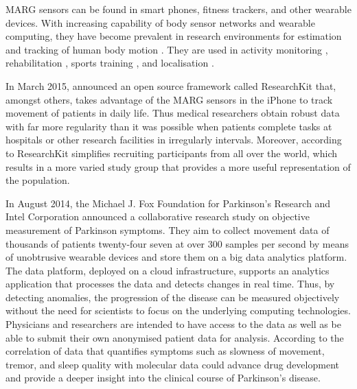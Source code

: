 MARG sensors can be found in smart phones, fitness trackers, and other wearable devices. With increasing capability of body sensor networks and wearable computing, they have become prevalent in research environments for estimation and tracking of human body motion \cite{bennett_motion_2014}. They are used in activity monitoring \cite{veltink_detection_96}\cite{najafi_ambulatory_03}\cite{ermes_sports_08}, rehabilitation \cite{giggins_rehabilitation_13}\cite{lupinski_ligament_11}, sports training \cite{bonnet_squat_13}\cite{ermes_sports_08}, and localisation \cite{hoflinger_localization_13}\cite{Bennett_distance_13}.

In March 2015, \citeauthor{Apple_2015} announced an open source framework called ResearchKit \cite{Apple_2015} that, amongst others, takes advantage of the MARG sensors in the iPhone to track movement of patients in daily life. Thus medical researchers obtain robust data with far more regularity than it was possible when patients complete tasks at hospitals or other research facilities in irregularly intervals. Moreover, according to \citeauthor{Apple_2015} ResearchKit simplifies recruiting participants from all over the world, which results in a more varied study group that provides a more useful representation of the population.

In August 2014, the Michael J. Fox Foundation for Parkinson’s Research and Intel Corporation \cite{Intel_2013} announced a collaborative research study on objective measurement of Parkinson symptoms. They aim to collect movement data of thousands of patients twenty-four seven at over 300 samples per second by means of unobtrusive wearable devices and store them on a big data analytics platform. The data platform, deployed on a cloud infrastructure, supports an analytics application that processes the data and detects changes in real time. Thus, by detecting anomalies, the progression of the disease can be measured objectively without the need for scientists to focus on the underlying computing technologies. Physicians and researchers are intended to have access to the data as well as be able to submit their own anonymised patient data for analysis. According to \cite{Intel_2013} the correlation of data that quantifies symptoms such as slowness of movement, tremor, and sleep quality with molecular data could advance drug development and provide a deeper insight into the clinical course of Parkinson's disease.



